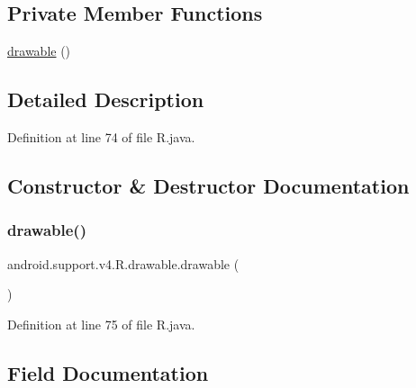 \subsection*{Private Member Functions}
\begin{DoxyCompactItemize}
\item 
\mbox{\hyperlink{classandroid_1_1support_1_1v4_1_1_r_1_1drawable_ae4c6c8c6bc940c55d61429f83274c386}{drawable}} ()
\end{DoxyCompactItemize}


\subsection{Detailed Description}


Definition at line 74 of file R.\+java.



\subsection{Constructor \& Destructor Documentation}
\mbox{\label{classandroid_1_1support_1_1v4_1_1_r_1_1drawable_ae4c6c8c6bc940c55d61429f83274c386}} 
\subsubsection{\texorpdfstring{drawable()}{drawable()}}
{\footnotesize\ttfamily android.\+support.\+v4.\+R.\+drawable.\+drawable (\begin{DoxyParamCaption}{ }\end{DoxyParamCaption})\hspace{0.3cm}{\ttfamily [private]}}



Definition at line 75 of file R.\+java.


\begin{DoxyCode}{0}

\end{DoxyCode}


\subsection{Field Documentation}
\mbox{\label{classandroid_1_1support_1_1v4_1_1_r_1_1drawable_a1c5ea12cd4bf083ceae928a72012a29d}} 
